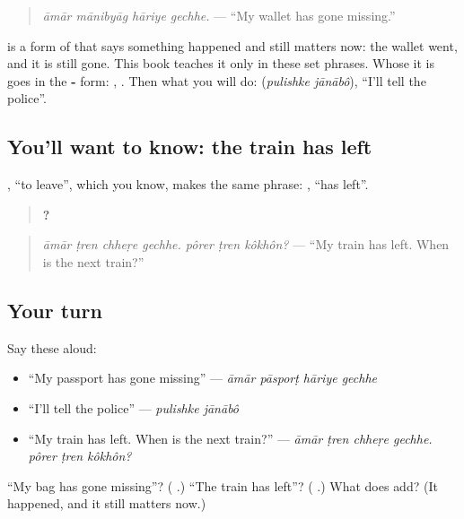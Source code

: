 \begin{quote}
\emph{āmār mānibyāg hāriye gechhe.} — \textquotedblleft{}My wallet has gone missing.\textquotedblright{}
\end{quote}

\textbf{} is a form of \textbf{} that says something happened and still matters now: the wallet went, and it is still gone. This book teaches it only in these set phrases. Whose it is goes in the \textbf{-} form: \textbf{ }, \textbf{ }. Then what you will do: \textbf{ } (\emph{pulishke jānābô}), \textquotedblleft{}I'll tell the police\textquotedblright{}.

\subsection*{You'll want to know: the train has left}
\textbf{}, \textquotedblleft{}to leave\textquotedblright{}, which you know, makes the same phrase: \textbf{ }, \textquotedblleft{}has left\textquotedblright{}.

\begin{quote}
\textbf{      ?}
\end{quote}

\begin{quote}
\emph{āmār ṭren chheṛe gechhe. pôrer ṭren kôkhôn?} — \textquotedblleft{}My train has left. When is the next train?\textquotedblright{}
\end{quote}

\subsection*{Your turn}
Say these aloud:

\begin{itemize}
\raggedright
  \item \textquotedblleft{}My passport has gone missing\textquotedblright{} — \emph{āmār pāsporṭ hāriye gechhe}
  \item \textquotedblleft{}I'll tell the police\textquotedblright{} — \emph{pulishke jānābô}
  \item \textquotedblleft{}My train has left. When is the next train?\textquotedblright{} — \emph{āmār ṭren chheṛe gechhe. pôrer ṭren kôkhôn?}
\end{itemize}

\begin{tcolorbox}[breakable,colback=teal!4,colframe=teal!35!black,title={Before you move on}]
\textquotedblleft{}My bag has gone missing\textquotedblright{}? (\textbf{   }.) \textquotedblleft{}The train has left\textquotedblright{}? (\textbf{  }.) What does \textbf{} add? (It happened, and it still matters now.)
\end{tcolorbox}

